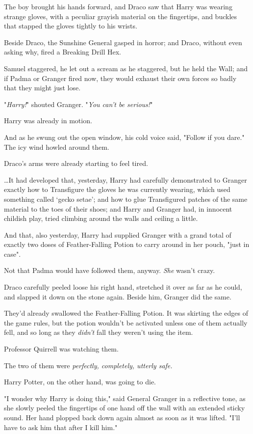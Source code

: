 The boy brought his hands forward, and Draco saw that Harry was wearing strange
gloves, with a peculiar grayish material on the fingertips, and buckles that
stapped the gloves tightly to his wrists.

Beside Draco, the Sunshine General gasped in horror; and Draco, without even
asking why, fired a Breaking Drill Hex.

Samuel staggered, he let out a scream as he staggered, but he held the Wall;
and if Padma or Granger fired now, they would exhaust their own forces so badly
that they might just lose.

"\emph{Harry!}" shouted Granger. "\emph{You can't be serious!}"

Harry was already in motion.

And as he swung out the open window, his cold voice said, "Follow if you dare."
\later
The icy wind howled around them.

Draco's arms were already starting to feel tired.

{\ldots}It had developed that, yesterday, Harry had carefully demonstrated to
Granger exactly how to Transfigure the gloves he was currently wearing, which
used something called `gecko setae'; and how to glue Transfigured patches of
the same material to the toes of their shoes; and Harry and Granger had, in
innocent childish play, tried climbing around the walls and ceiling a little.

And that, also yesterday, Harry had supplied Granger with a grand total of
exactly two doses of Feather-Falling Potion to carry around in her pouch, "just
in case".

Not that Padma would have followed them, anyway. \emph{She} wasn't crazy.

Draco carefully peeled loose his right hand, stretched it over as far as he
could, and slapped it down on the stone again. Beside him, Granger did the same.

They'd already swallowed the Feather-Falling Potion. It was skirting the edges
of the game rules, but the potion wouldn't be activated unless one of them
actually fell, and so long as they \emph{didn't} fall they weren't using the
item.

Professor Quirrell was watching them.

The two of them were \emph{perfectly, completely, utterly safe.}

Harry Potter, on the other hand, was going to die.

"I wonder why Harry is doing this," said General Granger in a reflective tone,
as she slowly peeled the fingertips of one hand off the wall with an extended
sticky sound. Her hand plopped back down again almost as soon as it was lifted.
"I'll have to ask him that after I kill him."

